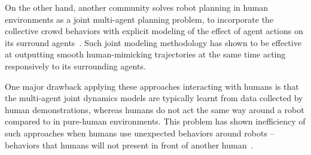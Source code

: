 \documentclass[letterpaper, 10 pt, conference]{ieeeconf}  %
\begin{document}
On the other hand, another community solves robot planning in human environments as a 
joint multi-agent planning problem, to incorporate the collective crowd 
behaviors with explicit modeling of the effect of agent actions on its 
surround agents~\cite{trautman2010unfreezing,kuderer2012feature,mavrogiannis2016decentralized}. Such joint modeling methodology has 
shown to be effective at outputting smooth human-mimicking trajectories at the same 
time acting responsively to its surrounding agents.

One major drawback applying these approaches interacting with humans is that the 
multi-agent joint dynamics models are typically learnt from data collected by 
human demonstrations, whereas humans do not act the same way around a robot compared to in 
pure-human environments. This problem has shown 
inefficiency of such approaches when humans use unexpected behaviors 
around robots -- behaviors that humans will not present in front of another 
human~\cite{pfeiffer2016predicting}. 



%


\end{document}
